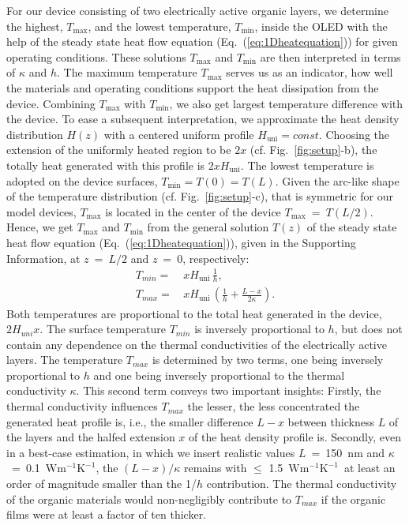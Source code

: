 \documentclass[%
9pt,
 aip,
rsi,%
 amsmath,amssymb,
preprint,%
]{revtex4-1}
\newcommand{\thermalconductivity}{$\mathrm{W m^{-1} K^{-1}}$}
\begin{document}
For our device consisting of two electrically active organic layers, we determine the highest, $T_{\mathrm{max}}$, and the lowest temperature, $T_{\mathrm{min}}$, inside the OLED with the help of the steady state heat flow equation (Eq.~(\ref{eq:1Dheatequation})) for given operating conditions. These solutions $T_{\mathrm{max}}$ and $T_{\mathrm{min}}$ are then interpreted in terms of $\kappa$ and $h$.
The maximum temperature $T_{\mathrm{max}}$ serves us as an indicator, how well the materials and operating conditions support the heat dissipation from the device. 
Combining $T_{\mathrm{max}}$ with $T_{\mathrm{min}}$, we also get largest temperature difference with the device.
To ease a subsequent interpretation, we approximate the heat density distribution $H(z)$ with a centered uniform profile $H_{\mathrm{uni}} = const$. 
Choosing the extension of the uniformly heated region to be $2x$ (cf. Fig.~\ref{fig:setup}-b), the totally heat generated with this profile is $2 x H_{\mathrm{uni}}$.
The lowest temperature is adopted on the device surfaces, $T_{\mathrm{min}} = T(0) = T(L)$. 
Given the arc-like shape of the temperature distribution (cf. Fig.~\ref{fig:setup}-c), that is symmetric for our model devices, $T_{\mathrm{max}}$ is located in the center of the device $T_{\mathrm{max}}$~=~$T(L/2)$.
%
Hence, we get $T_{\mathrm{max}}$ and $T_{\mathrm{min}}$  from the general solution $T(z)$ of the steady state heat flow equation (Eq.~(\ref{eq:1Dheatequation})), given in the Supporting Information, at $z~=~L/2$ and $z~=~0$, respectively:
\begin{subequations}
      \begin{align}
      	T_{min}=&\, x H_{\mathrm{uni}}\, \frac{1}{h},                                             \label{eq:analtmin}\\
        T_{max}=&\, x H_{\mathrm{uni}}\, \left(\frac{1}{h}+\frac{L - x}{2\kappa}\right) .		 \label{eq:analtmax}
      \end{align}
      \label{eq:analt} 
\end{subequations}
%
Both temperatures are proportional to the total heat generated in the device, $2 H_{uni} x$.
The surface temperature $T_{min}$ is inversely proportional to $h$, but does not contain any dependence on the thermal conductivities of the electrically active layers.
The temperature $T_{max}$ is determined by two terms, one being inversely proportional to $h$ and one being inversely proportional to the thermal conductivity $\kappa$. 
This second term conveys two important insights:
Firstly, the thermal conductivity influences $T_{max}$ the lesser, the less concentrated the generated heat profile is, i.e., the smaller difference $L-x$ between thickness $L$ of the layers and the halfed extension $x$ of the heat density profile is.
Secondly, even in a best-case estimation, in which we insert realistic values $L$~=~150~nm and $\kappa$~=~0.1~\thermalconductivity, the $(L-x)/\kappa$ remains with $\leq$ 1.5~\thermalconductivity~at least an order of magnitude smaller than the 1/$h$ contribution.
The thermal conductivity of the organic materials would non-negligibly contribute to $T_{max}$ if the organic films were at least a factor of ten thicker.
\end{document}
